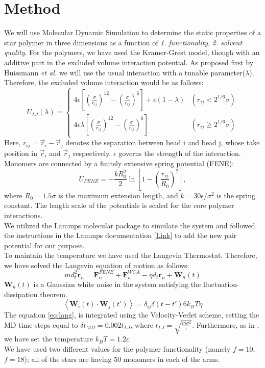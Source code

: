 \section{Method}
We will use Molecular Dynamic Simulation to determine the static properties of a star polymer in three dimensions as a function of \textit{1. functionality}, \textit{2. solvent quality}.
For the polymers, we have used the Kramer-Grest model, though with an additive part in the excluded volume interaction potential. As proposed first by Huissmann \textit{et al.} we will use the usual interaction with a tunable parameter($\lambda$). Therefore, the excluded volume interaction would be as follows:
\begin{equation}
	U_{LJ}(\lambda) =      
	\begin{cases}
		4\epsilon[(\frac{\sigma}{r_{ij}})^{12} - (\frac{\sigma}{r_{ij}})^{6}] 
  + \epsilon(1 - \lambda)
  & (r_{ij}<2^{1/6}\sigma)
  \\
		4\epsilon\lambda[(\frac{\sigma}{r_{ij}})^{12} - (\frac{\sigma}{r_{ij}})^{6}] 
  & (r_{ij}\geq2^{1/6}\sigma)
	\end{cases}
\end{equation}
Here, $ r_{ij} = \vec{r}_i - \vec{r}_j $ denotes the separation between bead i and bead j, whose take position in $ \vec{r}_i $ and $ \vec{r}_j $ respectively. $ \epsilon $ governs the strength of the interaction.
Monomers are connected by a finitely extensive spring potential (FENE):
\begin{equation}
	U_{FENE} = -\frac{kR_0^2}{2} \ln\left[ 1 - (\frac{r_{ij}}{R_0})^2\right],
\end{equation}
where $ R_0 = 1.5 \sigma $ is the maximum extension length, and $ k = 30\epsilon/\sigma^2 $ is the spring constant. The length scale of the potentials is scaled for the core polymer interactions.
\\
We utilized the Lammps molecular package to simulate the system and followed the instructions in the Lammps documentation [\hyperlink{https://docs.lammps.org/Developer_write_pair.html}{Link}] to add the new pair potential for our purpose.
\\
To maintain the temperature we have used the Langevin Thermostat.
Therefore, we have solved the Langevin equation of motion as follows:
\begin{equation}
    m d^2_t\bm{r}_n = \bm{F}_n^{FENE} + \bm{F}_n^{WCA} -\eta d_t\bm{r}_n + \bm{W}_n(t)
    \label{eq:lang}
\end{equation}
 $\bm{W}_n(t)$ is a Gaussian white noise in the system satisfying the fluctuation-dissipation theorem.
\begin{equation}
    \left< \bm{W}_i(t) \cdot \bm{W}_j(t') \right> = \delta_{ij} \delta(t - t') 6k_BT \eta 
\end{equation}
The equation \ref{eq:lang}, is integrated using the Velocity-Verlet scheme, setting the MD time steps equal to $\delta t_{MD} = 0.002t_{LJ}$, where $t_{LJ} = \sqrt{\frac{m\sigma^2}{\epsilon}}$. 
Furthermore, as  in \cite{Huissmann2009}, we have set the temperature $k_BT = 1.2 \epsilon$.
\\ 
We have used two different values for the polymer functionality (namely $f = 10$, $f = 18$); all of the stars are having 50 monomers in each of the arms.
